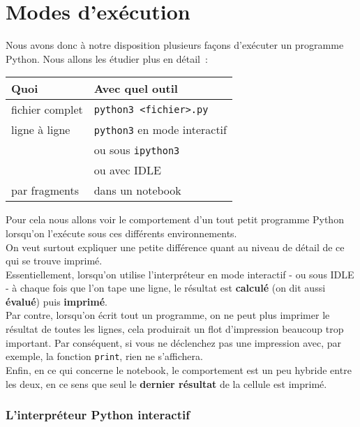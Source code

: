     \hypertarget{modes-dexuxe9cution}{%
\section{Modes d'exécution}\label{modes-dexuxe9cution}}

    Nous avons donc à notre disposition plusieurs façons d'exécuter un
programme Python. Nous allons les étudier plus en détail~:

    \begin{longtable}[]{@{}ll@{}}
\toprule
Quoi & Avec quel outil\tabularnewline
\midrule
\endhead
fichier complet &
\texttt{python3\ \textless{}fichier\textgreater{}.py}\tabularnewline
ligne à ligne & \texttt{python3} en mode interactif\tabularnewline
~ & ou sous \texttt{ipython3}\tabularnewline
~ & ou avec IDLE\tabularnewline
par fragments & dans un notebook\tabularnewline
\bottomrule
\end{longtable}

    Pour cela nous allons voir le comportement d'un tout petit programme
Python lorsqu'on l'exécute sous ces différents environnements.\\

On veut surtout expliquer une petite différence quant au niveau de
détail de ce qui se trouve imprimé.\\

    Essentiellement, lorsqu'on utilise l'interpréteur en mode interactif -
ou sous IDLE - à chaque fois que l'on tape une ligne, le résultat est
\textbf{calculé} (on dit aussi \textbf{évalué}) puis \textbf{imprimé}.\\

Par contre, lorsqu'on écrit tout un programme, on ne peut plus imprimer
le résultat de toutes les lignes, cela produirait un flot d'impression
beaucoup trop important. Par conséquent, si vous ne déclenchez pas une
impression avec, par exemple, la fonction \texttt{print}, rien ne
s'affichera.\\

Enfin, en ce qui concerne le notebook, le comportement est un peu
hybride entre les deux, en ce sens que seul le \textbf{dernier résultat}
de la cellule est imprimé.

    \hypertarget{linterpruxe9teur-python-interactif}{%
\subsubsection{L'interpréteur Python
interactif}\label{linterpruxe9teur-python-interactif}}

